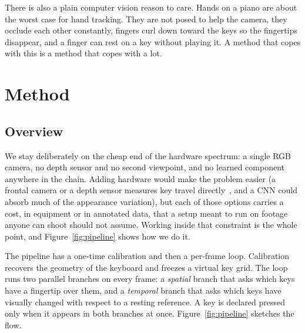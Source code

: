 \documentclass[11pt]{article}
\begin{document}
There is also a plain computer vision reason to care. Hands on a piano are about
the worst case for hand tracking. They are not posed to help the camera, they
occlude each other constantly, fingers curl down toward the keys so the
fingertips disappear, and a finger can rest on a key without playing it. A
method that copes with this is a method that copes with a lot.

\section{Method}

\subsection{Overview}
We stay deliberately on the cheap end of the hardware spectrum: a single RGB
camera, no depth sensor and no second viewpoint, and no learned component
anywhere in the chain. Adding hardware would make the problem easier (a frontal
camera or a depth sensor measures key travel directly~\cite{akbari2015pianodepth},
and a CNN could absorb much of the appearance variation), but each of those
options carries a cost, in equipment or in annotated data, that a setup meant to
run on footage anyone can shoot should not assume. Working inside that
constraint is the whole point, and Figure~\ref{fig:pipeline} shows how we do it.

The pipeline has a one-time calibration and then a per-frame loop. Calibration
recovers the geometry of the keyboard and freezes a virtual key grid. The loop
runs two parallel branches on every frame: a \emph{spatial} branch that asks
which keys have a fingertip over them, and a \emph{temporal} branch that asks
which keys have visually changed with respect to a resting reference. A key is
declared pressed only when it appears in both branches at once. Figure~\ref{fig:pipeline}
sketches the flow.
\end{document}
